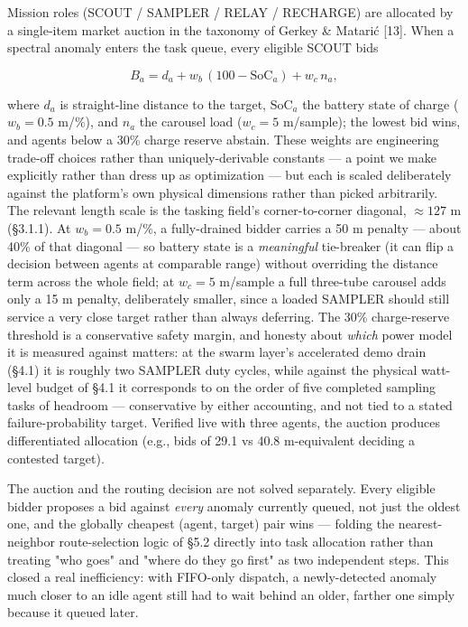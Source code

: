 \documentclass[conference]{IEEEtran}
\begin{document}
Mission roles (SCOUT / SAMPLER / RELAY / RECHARGE) are allocated by a single-item market auction in the taxonomy of Gerkey \& Matari\'c [13]. When a spectral anomaly enters the task queue, every eligible SCOUT bids

\begin{equation*}B_a = d_a + w_b\,(100 - \mathrm{SoC}_a) + w_c\,n_a,\end{equation*}

where $d_a$ is straight-line distance to the target, $\mathrm{SoC}_a$ the battery state of charge ($w_b = 0.5$ m/\%), and $n_a$ the carousel load ($w_c = 5$ m/sample); the lowest bid wins, and agents below a 30\% charge reserve abstain. These weights are engineering trade-off choices rather than uniquely-derivable constants --- a point we make explicitly rather than dress up as optimization --- but each is scaled deliberately against the platform's own physical dimensions rather than picked arbitrarily. The relevant length scale is the tasking field's corner-to-corner diagonal, $\approx 127$ m (\S3.1.1). At $w_b = 0.5$ m/\%, a fully-drained bidder carries a 50 m penalty --- about 40\% of that diagonal --- so battery state is a \emph{meaningful} tie-breaker (it can flip a decision between agents at comparable range) without overriding the distance term across the whole field; at $w_c = 5$ m/sample a full three-tube carousel adds only a 15 m penalty, deliberately smaller, since a loaded SAMPLER should still service a very close target rather than always deferring. The 30\% charge-reserve threshold is a conservative safety margin, and honesty about \emph{which} power model it is measured against matters: at the swarm layer's accelerated demo drain (\S4.1) it is roughly two SAMPLER duty cycles, while against the physical watt-level budget of \S4.1 it corresponds to on the order of five completed sampling tasks of headroom --- conservative by either accounting, and not tied to a stated failure-probability target. Verified live with three agents, the auction produces differentiated allocation (e.g., bids of 29.1 vs 40.8 m-equivalent deciding a contested target).

The auction and the routing decision are not solved separately. Every eligible bidder proposes a bid against \emph{every} anomaly currently queued, not just the oldest one, and the globally cheapest (agent, target) pair wins --- folding the nearest-neighbor route-selection logic of \S5.2 directly into task allocation rather than treating "who goes" and "where do they go first" as two independent steps. This closed a real inefficiency: with FIFO-only dispatch, a newly-detected anomaly much closer to an idle agent still had to wait behind an older, farther one simply because it queued later.
\end{document}
